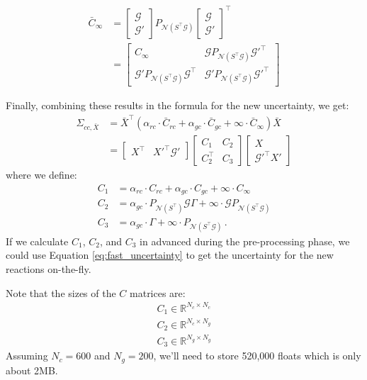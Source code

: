 \documentclass[twocolumn]{article}
\newcommand{\Gmat}{\mathcal{G}}
\newcommand{\PNmat}[1]{P_{\mathcal{N}\left(#1\right)}}
\begin{document}
\begin{align}
	\bar{C}_{\infty} &=
		\begin{bmatrix} \Gmat \\ \Gmat' \end{bmatrix}
		\PNmat{S^\top\Gmat}
		\begin{bmatrix} \Gmat \\ \Gmat' \end{bmatrix}^\top
\\ &=
\begin{bmatrix}
	C_\infty &
	\Gmat \PNmat{S^\top\Gmat} \Gmat'^\top \\
	\Gmat' \PNmat{S^\top\Gmat} \Gmat^\top &
	\Gmat' \PNmat{S^\top\Gmat} \Gmat'^\top
\end{bmatrix} \nonumber
\end{align}

Finally, combining these results in the formula for the new uncertainty, we get:
\begin{align}\label{eq:fast_uncertainty}
\Sigma_{cc,\bar{X}} &= \bar{X}^{\top} \left( \alpha_{rc}\cdot \bar{C}_{rc} + \alpha_{gc}\cdot \bar{C}_{gc} + \infty\cdot \bar{C}_{\infty}  \right) \bar{X} \nonumber\\
&= 
\begin{bmatrix} X^\top & X'^\top \Gmat' \end{bmatrix}
\begin{bmatrix} C_1 & C_2 \\ C_2^\top & C_3 \end{bmatrix}
\begin{bmatrix} X \\ \Gmat'^\top X' \end{bmatrix}
\end{align}
where we define:
\begin{align*}
	C_1 &= \alpha_{rc} \cdot C_{rc} + \alpha_{gc} \cdot C_{gc} + \infty \cdot C_\infty \\
	C_2 &= \alpha_{gc} \cdot \PNmat{S^\top} \Gmat \Gamma + \infty \cdot \Gmat \PNmat{S^\top\Gmat} \\
	C_3 &= \alpha_{gc} \cdot \Gamma + \infty \cdot \PNmat{S^\top\Gmat}\,.
\end{align*}
If we calculate $C_1$, $C_2$, and $C_3$ in advanced during the pre-processing phase, we could use Equation \ref{eq:fast_uncertainty} to get the uncertainty for the new reactions on-the-fly.

Note that the sizes of the $C$ matrices are:
\begin{eqnarray}
	C_1 \in \mathbb{R}^{N_c \times N_c} \\
	C_2 \in \mathbb{R}^{N_c \times N_g} \\
	C_3 \in \mathbb{R}^{N_g \times N_g}
\end{eqnarray}
Assuming $N_c = 600$ and $N_g = 200$, we'll need to store 520,000 floats which is only about 2MB.
\end{document}
